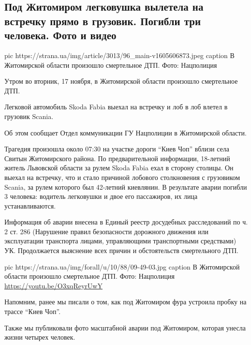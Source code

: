  
 

 

\subsection{Под Житомиром легковушка вылетела на встречку прямо в грузовик. Погибли три человека. Фото и видео}
\label{sec:16_11_2020.news.ua.strana.3.dtp.zhitomir}

\ifcmt
pic https://strana.ua/img/article/3013/96_main-v1605606873.jpeg
caption В Житомирской области произошло смертельное ДТП. Фото: Нацполиция 
\fi

Утром во вторник, 17 ноября, в Житомирской области произошло смертельное ДТП.

Легковой автомобиль Skoda Fabia выехал на встречку и лоб в лоб влетел в
грузовик Scania.

Об этом сообщает Отдел коммуникации ГУ Нацполиции в Житомирской области.  

Трагедия произошла около 07:30 на участке дороги \enquote{Киев \dshM Чоп} вблизи села
Свитын Житомирского района. По предварительной информации, 18-летний
житель Львовской области за рулем Skoda Fabia ехал в сторону столицы. Он
выехал на встречку, что и стало причиной лобового столкновения
с грузовиком Scania, за рулем которого был 42-летний киевлянин. В
результате аварии погибли 3 человека: водитель легковушки и двое его
пассажиров, их лица устанавливаются. 

Информация об аварии внесена в Единый реестр досудебных расследований по
ч. 2 ст. 286 (Нарушение правил безопасности дорожного движения или
эксплуатации транспорта лицами, управляющими транспортными средствами) УК.
Продолжается выяснение всех причин и обстоятельств смертельного ДТП.

\ifcmt
pic https://strana.ua/img/forall/u/10/88/09-49-03.jpg
caption В Житомирской области произошло смертельное ДТП. Фото: Нацполиция \url{https://youtu.be/O3xqReyrUwY}
\fi


Напомним, ранее мы писали о том, как под Житомиром фура устроила пробку на
трассе \enquote{Киев \dshM Чоп}.

Также мы публиковали фото масштабной аварии под Житомиром, которая унесла
жизни четырех человек.


